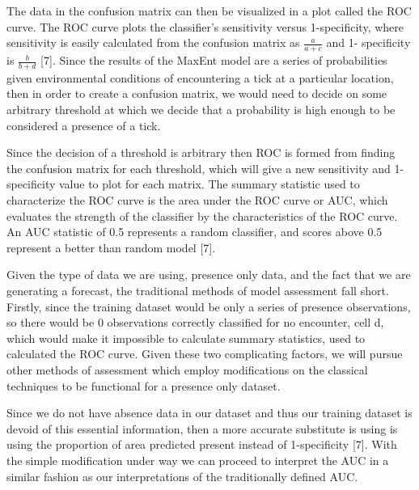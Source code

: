 \noindent The data in the confusion matrix can then be visualized in a plot called the ROC curve. The ROC curve plots the classifier's sensitivity versus 1-specificity, where sensitivity is easily calculated from the confusion matrix as  $\frac{a}{a+c}$ and 1- specificity is $\frac{b}{b+d}$ [7]. Since the results of the MaxEnt model are a series of probabilities given environmental conditions of encountering a tick at a particular location, then in order to create a confusion matrix, we would need to decide on some arbitrary threshold at which we decide that a probability is high enough to be considered a presence of a tick. \newline

\noindent Since the decision of a threshold is arbitrary then ROC is formed from finding the confusion matrix for each threshold, which will give a new sensitivity and 1-specificity value to plot for each matrix. The summary statistic used to characterize the ROC curve is the area under the ROC curve or AUC, which evaluates the strength of the classifier by the characteristics of the ROC curve. An AUC statistic of 0.5 represents a random classifier, and scores above 0.5 represent a better than random model [7].    \newline

\noindent Given the type of data we are using, presence only data, and the fact that we are generating a forecast, the traditional methods of model assessment fall short. Firstly, since the training dataset would be only a series of presence observations, so there would be 0 observations correctly classified for no encounter, cell d,  which would make it impossible to calculate summary statistics, used to calculated the ROC curve. Given these two complicating factors, we will pursue other methods of assessment which employ modifications on the classical techniques to be functional for a presence only dataset.  \newline

\noindent Since we do not have absence data in our dataset and thus our training dataset is devoid of this essential information, then a more accurate substitute is using is using the proportion of area predicted present instead of 1-specificity [7]. With the simple modification under way we can proceed to interpret the AUC in a similar fashion as our interpretations of the traditionally defined AUC.  \newline


